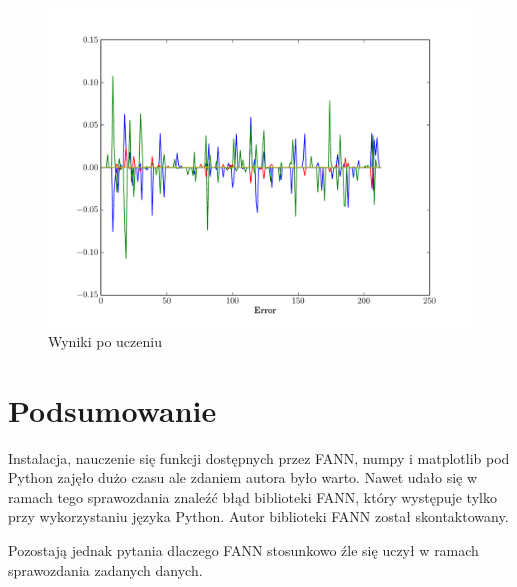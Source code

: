 \documentclass[pointlessnumbers, abstracton, headsepline, a4paper]{scrartcl}
\begin{document}
\clearpage
\begin{figure}[!h]
\centering
\includegraphics[scale=0.7]{src/glass.pdf}\caption{\label{fig:xor_result}Wyniki po uczeniu}
\end{figure}

\clearpage
\begin{center}
\lstset{captionpos=b,caption=Kod uczenia plików,label=lst:learn.py}

\end{center}

\section{Podsumowanie}
Instalacja, nauczenie się funkcji dostępnych przez FANN, numpy i matplotlib pod Python zajęło dużo czasu ale zdaniem autora było warto. Nawet udało się w ramach tego sprawozdania znaleźć błąd biblioteki FANN, który występuje tylko przy wykorzystaniu języka Python. Autor biblioteki FANN został skontaktowany.

Pozostają jednak pytania dlaczego FANN stosunkowo źle się uczył w ramach sprawozdania zadanych danych.
\end{document}
